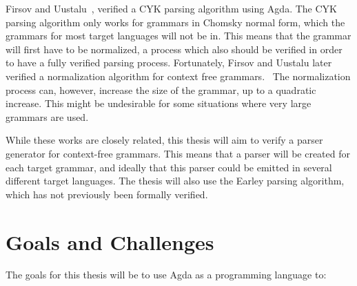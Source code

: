 \documentclass{article}
\begin{document}
	Firsov and Uustalu~\cite{Firsov14}, verified a CYK parsing algorithm using
	Agda. The CYK parsing algorithm only works for grammars in Chomsky normal
	form, which the grammars for most target languages will not be in. This
	means that the grammar will first have to be normalized, a process which
	also should be verified in order to have a fully verified parsing process.
	Fortunately, Firsov and Uustalu later verified a normalization algorithm
	for context free grammars.~\cite{Firsov15} The normalization process can,
	however, increase the size of the grammar, up to a quadratic increase. This
	might be undesirable for some situations where very large grammars are
	used.

	While these works are closely related, this thesis will aim to verify a
	parser generator for context-free grammars. This means that a parser will
	be created for each target grammar, and ideally that this parser could be
	emitted in several different target languages. The thesis will also use the
	Earley parsing algorithm, which has not previously been formally verified.

\section{Goals and Challenges}

	
	The goals for this thesis will be to use Agda as a programming language to:
	
\end{document}
